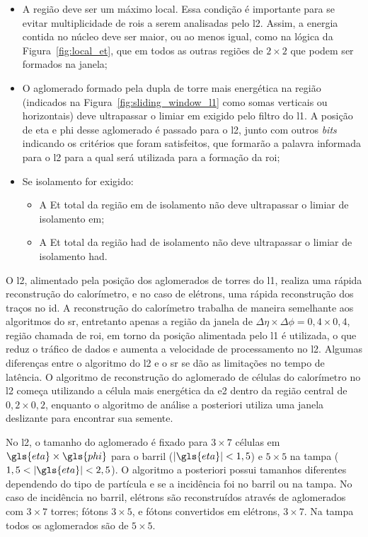\begin{itemize}
\item A região deve ser um máximo local. Essa condição é importante para se
evitar multiplicidade de \glspl{roi} a serem analisadas pelo \gls{l2}.
Assim, a energia contida no núcleo deve ser
maior, ou ao menos igual, como na lógica da Figura~\ref{fig:local_et}, 
que em todos as outras regiões de $2\times2$ que podem ser formados na
janela;
\item O aglomerado formado pela dupla de torre mais energética na região
(indicados na Figura~\ref{fig:sliding_window_l1} como somas verticais ou horizontais) deve ultrapassar o limiar
\gls{em} exigido pelo filtro do \gls{l1}. A posição de \gls{eta} e \gls{phi} desse aglomerado é passado
para o \gls{l2}, junto com outros \emph{bits} indicando os critérios que foram
satisfeitos, que formarão a palavra informada para o \gls{l2} para a qual será
utilizada para a formação da \gls{roi};
\item Se isolamento for exigido: 
\begin{itemize}
\item A \gls{Et} total da região \gls{em} de
isolamento não deve ultrapassar o limiar de isolamento \gls{em};
\item A \gls{Et} total da região \gls{had} de isolamento não deve ultrapassar o
limiar de isolamento \gls{had}.
\end{itemize}
\end{itemize}


O \gls{l2}, alimentado pela posição dos
aglomerados de torres do \gls{l1}, realiza uma rápida reconstrução do
calorímetro, e no caso de elétrons, uma rápida reconstrução dos traços no \gls{id}. A
reconstrução do calorímetro trabalha de maneira semelhante aos algoritmos do
\gls{sr}, entretanto apenas a região da janela de $\Delta\eta\times\Delta\phi =
0,4 \times 0,4$, região chamada de \gls{roi}, em torno da posição alimentada pelo \gls{l1} 
é utilizada, o que reduz o tráfico de dados e aumenta a velocidade de processamento no \gls{l2}.
Algumas diferenças entre o algoritmo do \gls{l2} e o \gls{sr} se dão as
limitações no tempo de latência. O algoritmo de reconstrução do aglomerado de
células do calorímetro no \gls{l2} começa utilizando a célula mais energética da
\gls{e2} dentro da região central de $0,2 \times 0,2$, enquanto o
algoritmo de análise a posteriori utiliza uma janela deslizante para encontrar
sua semente.

No \gls{l2}, o tamanho do aglomerado é fixado para $3
\times 7$ células em $\gls{eta} \times \gls{phi}$ para o barril ($|\gls{eta}|<1,5$) e 
$5 \times 5$ na tampa ($1,5<|\gls{eta}|<2,5$). O algoritmo a posteriori possui
tamanhos diferentes dependendo do tipo de partícula e se a incidência foi no
barril ou na tampa. No caso de incidência no barril, elétrons são reconstruídos
através de aglomerados com $3\times7$ torres; fótons $3\times5$, 
e fótons convertidos em elétrons, $3\times7$. Na tampa todos os aglomerados 
são de $5\times5$.

